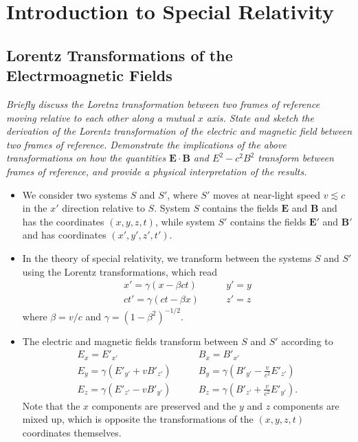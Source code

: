 \documentclass[11pt, a4paper]{article}
\renewcommand{\vec}[1]{\bm{#1}} %
\newcommand{\E}{\vec{E}} %
\newcommand{\B}{\vec{B}} %
\begin{document}
\newpage
\section{Introduction to Special Relativity}

\subsection{Lorentz Transformations of the Electrmoagnetic Fields}
\textit{Briefly discuss the Loretnz transformation between two frames of reference moving relative to each other along a mutual $ x $ axis. State and sketch the derivation of the Lorentz transformation of the electric and magnetic field between two frames of reference. Demonstrate the implications of the above transformations on how the quantities $ \E \cdot \B $ and $ E^{2} - c^{2}B^{2} $ transform between frames of reference, and provide a physical interpretation of the results.}

\begin{itemize}
	\item We consider two systems $ S $ and $ S' $, where $ S' $  moves at near-light speed $ v \lesssim c $ in the $ x' $ direction relative to $ S $. System $ S $ contains the fields $ \E $ and $ \B $ and has the coordinates $ (x, y, z, t) $, while system $ S' $ contains the fields $ \E' $ and $ \B' $ and has coordinates $ (x', y', z', t') $.
	
	\item In the theory of special relativity, we transform between the systems $ S $ and $ S' $ using the Lorentz transformations, which read
    \begin{equation*}
        \begin{array}{cc}
            x' = \gamma(x - \beta ct) & \qquad y' = y \\
            ct' = \gamma(ct - \beta x) & \qquad z' = z
        \end{array}
    \end{equation*}
    where $ \beta = v/c $ and $ \gamma = \left( 1 - \beta^{2} \right)^{-1/2} $.
	
	\item The electric and magnetic fields transform between $ S $ and $ S' $ according to
    \begin{equation*}
        \begin{array}{ll}
            E_{x} = E'_{x'} & \qquad B_{x} = B'_{x'}\\
            E_{y} = \gamma (E'_{y'} + v B'_{z'}) & \qquad B_{y} = \gamma \left (B'_{y'} - \frac{v}{c^{2}} E'_{z'}\right)\\
            E_{z} = \gamma (E'_{z'} - vB'_{y'}) & \qquad B_{z} = \gamma \left (B'_{z'} + \frac{v}{c^{2}} E'_{y'}\right ).
        \end{array}
    \end{equation*}
   	Note that the $ x $	components are preserved and the $ y $ and $ z $ components are mixed up, which is opposite the transformations of the $ (x, y, z, t) $ coordinates themselves.
\end{itemize}
\end{document}
